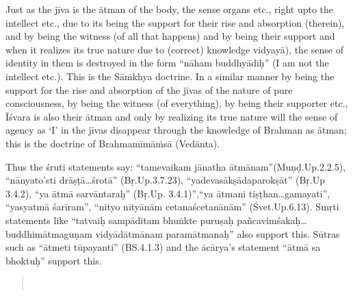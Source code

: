 Just as the jīva is the ātman of the body, the sense organs etc., right upto the intellect etc., due to its being the support for their rise and absorption (therein), and by being the witness (of all that happens) and by being their support and when it realizes its true nature due to (correct) knowledge vidyayā), the sense of identity in them is destroyed in the form “nāham buddhyādiḥ” (I am not the intellect etc.). This is the Sāṁkhya doctrine. In a similar manner by being the support for the rise and absorption of the jīvas of the nature of pure consciousness, by being the witness (of everything), by being their supporter etc., Īśvara is also their ātman and only by realizing its true nature will the sense of agency as ‘I’ in the jīvas disappear through the knowledge of Brahman as ātman; this is the doctrine of Brahmamīmāṁsā (Vedānta).

Thus the śruti statements say: “tamevaikam jānatha ātmānam”\break (Muṇḍ.Up.2.2.5), “nānyato’sti drāṣṭā…śrotā” (Bṛ.Up.3.7.23), “yadeva\break sākṣādaparokṣāt” (Bṛ.Up 3.4.2), ``ya ātmā sarvāntaraḥ” (Bṛ.Up. 3.4.1)”,\break ``ya ātmani tiṣṭhan…gamayati”, “yasyatmā śarīram”, “nityo nityānām cetanaścetanānām” (Śvet.Up.6.13). Smṛti statements like “tatvaiḥ sampāditam bhuṅkte puruṣaḥ pañcavimśakaḥ…buddhimātmaguṇam vidyādātmānam paramātmanaḥ” also support this. Sūtras such as “ātmeti tūpayanti” (BS.4.1.3) and the ācārya’s statement “ātmā sa bhoktuḥ” support this. 

\begin{verse}
\\
\end{verse}

